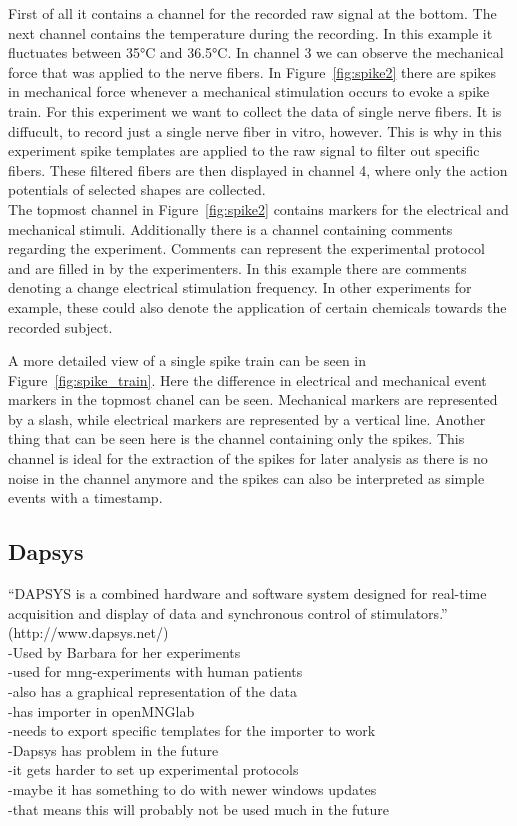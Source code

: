 First of all it contains a channel for the recorded raw signal at the bottom. The next channel contains the temperature during the recording. In this example it fluctuates between 35°C and 36.5°C. In channel 3 we can observe the mechanical force that was applied to the nerve fibers. In Figure~\ref{fig:spike2} there are spikes in mechanical force whenever a mechanical stimulation occurs to evoke a spike train. For this experiment we want to collect the data of single nerve fibers. It is diffucult, to record just a single nerve fiber in vitro, however. This is why in this experiment spike templates are applied to the raw signal to filter out specific fibers. These filtered fibers are then displayed in channel 4, where only the action potentials of selected shapes are collected.\\
The topmost channel in Figure~\ref{fig:spike2} contains markers for the electrical and mechanical stimuli. Additionally there is a channel containing comments regarding the experiment. Comments can represent the experimental protocol and are filled in by the experimenters. In this example there are comments denoting a change electrical stimulation frequency. In other experiments for example, these could also denote the application of certain chemicals towards the recorded subject.

A more detailed view of a single spike train can be seen in Figure~\ref{fig:spike_train}. Here the difference in electrical and mechanical event markers in the topmost chanel can be seen. Mechanical markers are represented by a slash, while electrical markers are represented by a vertical line. Another thing that can be seen here is the channel containing only the spikes. This channel is ideal for the extraction of the spikes for later analysis as there is no noise in the channel anymore and the spikes can also be interpreted as simple events with a timestamp.

\subsection{Dapsys}
“DAPSYS is a combined hardware and software system designed for real-time acquisition and display of data and synchronous control of stimulators.” (http://www.dapsys.net/) \\
-Used by Barbara for her experiments \\
-used for mng-experiments with human patients \\
-also has a graphical representation of the data \\
-has importer in openMNGlab \\
-needs to export specific templates for the importer to work \\
-Dapsys has problem in the future \\
-it gets harder to set up experimental protocols \\
-maybe it has something to do with newer windows updates \\
-that means this will probably not be used much in the future \\



